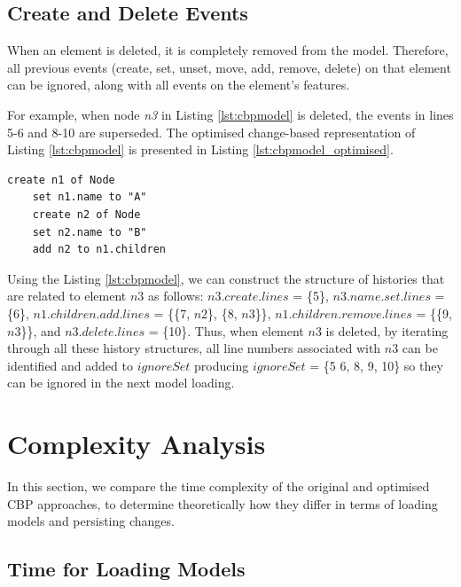 \documentclass{llncs}
\begin{document}
    
    \subsection{Create and Delete Events}
    \label{subsec:create_and_delete_operations}
    
    When an element is deleted, it is completely removed from the model. Therefore, all previous events (create, set, unset, move, add, remove, delete) on that element can be ignored, along with all events on the element's features. 
    
    For example, when node \emph{n3} in Listing \ref{lst:cbpmodel} is deleted, the events in lines 5-6 and 8-10 are superseded. The optimised change-based representation of Listing \ref{lst:cbpmodel} is presented in Listing \ref{lst:cbpmodel_optimised}.
    
    \begin{lstlisting}[style=eol,caption={Change-based representation of the model in Fig. \ref{fig:initial_model} after removal of node \emph{n3}.},label=lst:cbpmodel_optimised]
    create n1 of Node
    set n1.name to "A"
    create n2 of Node
    set n2.name to "B"
    add n2 to n1.children
    \end{lstlisting}
    
    Using the Listing \ref{lst:cbpmodel}, we can construct the structure of histories that are related to element $n3$ as follows: $n3$.$create$.$lines$ = \{5\}, $n3$.$name$.$set$.$lines$ = \{6\}, $n1$.$children$.$add$.$lines$ = \{\{7, $n2$\}, \{8, $n3$\}\}, $n1$.$children$.$remove$.$lines$ = \{\{9, $n3$\}\}, and $n3$.$delete$.$lines$ = \{10\}. Thus, when element $n3$ is deleted, by iterating through all these history structures, all line numbers associated with $n3$ can be identified and added to $ignoreSet$ producing $ignoreSet$ = \{5 6, 8, 9, 10\} so they can be ignored in the next model loading.
    
    \section{Complexity Analysis}
    \label{sec:complexity_analysis}
    
    In this section, we compare the time complexity of the original and optimised CBP approaches, to determine theoretically how they differ in terms of loading models and persisting changes.   
    
    \subsection{Time for Loading Models}
    
\end{document}

